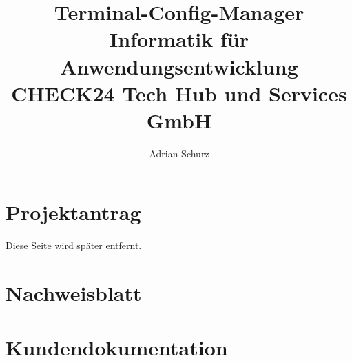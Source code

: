 \documentclass[a4paper,11pt,draft=false,bibliography=totoc]{scrartcl} %
\author{Adrian Schurz}
\title{Terminal-Config-Manager\\
	Informatik für Anwendungsentwicklung\\
	CHECK24 Tech Hub und Services GmbH\\
	}
\begin{document}

\maketitle
{}
\newpage

\section{Projektantrag}
\begin{center}
	Diese Seite wird später entfernt.
\end{center}


\section{Nachweisblatt} \label{Nachweisblatt}
\paragraph{}

\newpage
\tableofcontents
\newpage






\section{Kundendokumentation} \label{Kundendokumentation}











\printbibliography

\printglossaries
\end{document}
